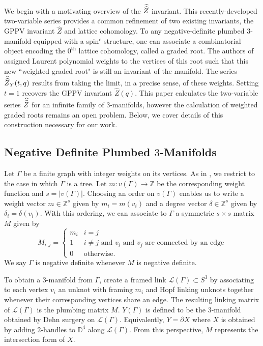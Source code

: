 \documentclass[11pt,letterpaper]{amsart}
\theoremstyle{definition}
\theoremstyle{plain}
\newcommand{\Z}{\mathbb{Z}}
\newcommand{\Zhat}{\widehat{Z}}
\newcommand{\Zhathat}{\widehat{\vphantom{\rule{5pt}{10pt}}\smash{\widehat{Z}}\,}\!}
\numberwithin{equation}{section}
\theoremstyle{example}
\begin{document}
We begin with a motivating overview of the $\Zhathat$ invariant. This recently-developed two-variable series provides a common refinement of two existing invariants, the GPPV invariant $\Zhat$ and lattice cohomology. To any negative-definite plumbed $3$-manifold equipped with a spin$^{c}$ structure, one can associate a combinatorial object encoding the $0^\text{th}$ lattice cohomology, called a graded root. The authors of \cite{latticecohomology} assigned Laurent polynomial weights to the vertices of this root such that this new ``weighted graded root" is still an invariant of the manifold. The series $\Zhathat_{Y}(t,q)$ results from taking the limit, in a precise sense, of these weights. Setting $t=1$ recovers the GPPV invariant $\Zhat(q)$. This paper calculates the two-variable series $\Zhathat$ for an infinite family of $3$-manifolds, however the calculation of weighted graded roots remains an open problem. Below, we cover details of this construction necessary for our work.

\subsection{Negative Definite Plumbed $3$-Manifolds}
Let $\Gamma$ be a finite graph with integer weights on its vertices.
As in \cite{latticecohomology}, we restrict to the case in which $\Gamma$ is a tree. Let $m:v(\Gamma)\to \Z$ be the corresponding weight function and $s=|v(\Gamma)|$. Choosing an order on $v(\Gamma)$ enables us to write a weight vector $m \in \Z^{s}$ given by $m_{i}=m(v_{i})$ and a degree vector $\delta \in \Z^{s}$ given by $\delta_{i}=\delta(v_{i})$. With this ordering, we can associate to $\Gamma$ a symmetric $s \times s$ matrix $M$ given by \[M_{i,j}=\begin{cases}m_{i} & i=j \\ 1 & i \neq j\text{ and $v_{i}$ and $v_{j}$ are connected by an edge} \\ 0 & \text{otherwise.}\end{cases}\] We say $\Gamma$ is negative definite whenever $M$ is negative definite.

To obtain a $3$-manifold from $\Gamma$, create a framed link $\mathcal{L}(\Gamma) \subset S^{3}$ by associating to each vertex $v_{i}$ an unknot with framing $m_{i}$ and Hopf linking unknots together whenever their corresponding vertices share an edge. The resulting linking matrix of $\mathcal{L}(\Gamma)$ is the plumbing matrix $M$. $Y(\Gamma)$ is defined to be the $3$-manifold obtained by Dehn surgery on $\mathcal{L}(\Gamma)$. Equivalently, $Y=\partial X$ where $X$ is obtained by adding $2$-handles to $\mathbb{D}^{4}$ along $\mathcal{L}(\Gamma)$. From this perspective, $M$ represents the intersection form of $X$. 
\end{document}
